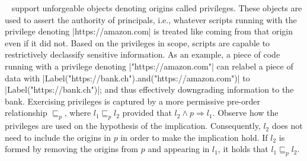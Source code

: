 \sys~ support unforgeable objects denoting origins called privileges. These
objects are used to assert the authority of principals, i.e., whatever scripts
running with the privilege denoting \js|https://amazon.com| is treated like
coming from that origin even if it did not. Based on the privileges in scope,
scripts are capable to restrictively declassify sensitive information.  As an
example, a piece of code running with a privilege denoting
\js|"https://amazon.com"| can relabel a piece of data with
\js|Label("https://bank.ch").and("https://amazon.com")| to
\js|Label("https://bank.ch")|; and thus effectively downgrading information to
the bank. Exercising privileges is captured by a more permissive pre-order
relationship $\sqsubseteq_p$, where $l_1 \sqsubseteq_p l_2$ provided that $l_2
\land p \Rightarrow l_1$. Observe how the privileges are used on the hypothesis
of the implication. Consequently, $l_2$ does not need to include the origins in
$p$ in order to make the implication hold. If $l_2$ is formed by removing the
origins from $p$ and appearing in $l_1$, it holds that $l_1 \sqsubseteq_p l_2$. 
 









